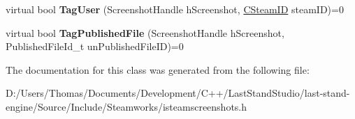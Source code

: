 \begin{DoxyCompactItemize}
\item 
\hypertarget{classISteamScreenshots_a6be39bbd3dffe9d68ef0ba008433e661}{}virtual bool {\bfseries Tag\+User} (Screenshot\+Handle h\+Screenshot, \hyperlink{classCSteamID}{C\+Steam\+I\+D} steam\+I\+D)=0\label{classISteamScreenshots_a6be39bbd3dffe9d68ef0ba008433e661}

\item 
\hypertarget{classISteamScreenshots_a1ac5913e5dbb450f06b7d3e5da1f2892}{}virtual bool {\bfseries Tag\+Published\+File} (Screenshot\+Handle h\+Screenshot, Published\+File\+Id\+\_\+t un\+Published\+File\+I\+D)=0\label{classISteamScreenshots_a1ac5913e5dbb450f06b7d3e5da1f2892}

\end{DoxyCompactItemize}


The documentation for this class was generated from the following file\+:\begin{DoxyCompactItemize}
\item 
D\+:/\+Users/\+Thomas/\+Documents/\+Development/\+C++/\+Last\+Stand\+Studio/last-\/stand-\/engine/\+Source/\+Include/\+Steamworks/isteamscreenshots.\+h\end{DoxyCompactItemize}
